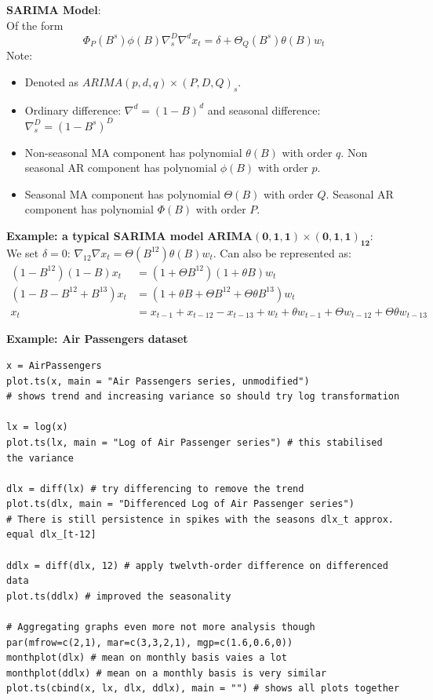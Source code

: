 \documentclass[11pt]{article}
\newcommand{\noi}{\noindent}
\begin{document}
\noi \textbf{SARIMA Model}: \\
\noi Of the form
$$\Phi_P(B^s)\phi(B)\nabla_{s}^{D}\nabla^{d}x_t = \delta + \Theta_Q(B^s)\theta(B)w_t$$
\noi Note:
\begin{itemize}
    \item Denoted as $ARIMA(p, d, q) \times (P, D, Q)_s$.
    \item Ordinary difference: $\nabla^d = (1-B)^d$ and seasonal difference: $\nabla_{s}^{D} = (1-B^s)^D$
    \item Non-seasonal MA component has polynomial $\theta(B)$ with order $q$. Non seasonal AR component has polynomial $\phi(B)$ with order $p$.
    \item Seasonal MA component has polynomial $\Theta(B)$ with order $Q$. Seasonal AR component has polynomial $\Phi(B)$ with order $P$.
\end{itemize} \phantom{i}

\noi \textbf{Example: a typical SARIMA model} $\boldsymbol{ARIMA(0, 1, 1) \times (0, 1, 1)_{12}}$: \\
\noi We set $\delta = 0$: $\nabla_{12}\nabla x_t = \Theta(B^{12})\theta(B)w_t$. Can also be represented as:
\begin{align*}
    (1-B^{12})(1-B)x_t &= (1 + \Theta B^{12})(1 + \theta B)w_t \\
    (1 - B - B^{12} + B^{13})x_t &= (1 + \theta B + \Theta B^{12} + \Theta \theta B^{13})w_t \\
    x_t &= x_{t-1} + x_{t-12} - x_{t-13} + w_t + \theta w_{t-1} + \Theta w_{t-12} + \Theta\theta w_{t-13}
\end{align*} 

\noi \textbf{Example: Air Passengers dataset} \\
\begin{lstlisting}
x = AirPassengers
plot.ts(x, main = "Air Passengers series, unmodified")
# shows trend and increasing variance so should try log transformation

lx = log(x)
plot.ts(lx, main = "Log of Air Passenger series") # this stabilised the variance

dlx = diff(lx) # try differencing to remove the trend
plot.ts(dlx, main = "Differenced Log of Air Passenger series")
# There is still persistence in spikes with the seasons dlx_t approx. equal dlx_[t-12]

ddlx = diff(dlx, 12) # apply twelvth-order difference on differenced data
plot.ts(ddlx) # improved the seasonality

# Aggregating graphs even more not more analysis though
par(mfrow=c(2,1), mar=c(3,3,2,1), mgp=c(1.6,0.6,0))
monthplot(dlx) # mean on monthly basis vaies a lot
monthplot(ddlx) # mean on a monthly basis is very similar
plot.ts(cbind(x, lx, dlx, ddlx), main = "") # shows all plots together
\end{lstlisting}
\end{document}
